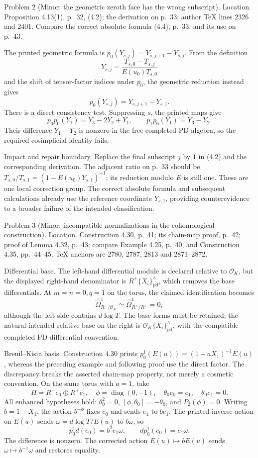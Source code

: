 \documentclass[10pt]{article}
\begin{document}
Problem 2 (Minor: the geometric zeroth face has the wrong subscript).  Location. Proposition 4.13(1), p. 32, (4.2); the derivation on p. 33; author TeX lines 2326 and 2401. Compare the correct absolute formula (4.4), p. 33, and its use on p. 43.\par
The printed geometric formula is \(p_0(Y_{s,j})=Y_{s,j+1}-Y_{s,j}\). From the definition \[Y_{s,j}=\frac{T_{s,0}-T_{s,j}}{E(u_0)T_{s,0}}\] and the shift of tensor-factor indices under \(p_0\), the geometric reduction instead gives \[p_0(Y_{s,j})=Y_{s,j+1}-Y_{s,1}.                 \tag{2.4}\] There is a direct consistency test. Suppressing \(s\), the printed maps give \[p_0p_0(Y_1)=Y_3-2Y_2+Y_1,\qquad
 p_1p_0(Y_1)=Y_3-Y_2.
 \tag{2.5}\] Their difference \(Y_1-Y_2\) is nonzero in the free completed PD algebra, so the required cosimplicial identity fails.\par
Impact and repair boundary. Replace the final subscript \(j\) by \(1\) in (4.2) and the corresponding derivation. The adjacent ratio on p. 33 should be \(T_{s,0}/T_{s,1}=(1-E(u_0)Y_{s,1})^{-1}\); its reduction modulo \(E\) is still one. These are one local correction group. The correct absolute formula and subsequent calculations already use the reference coordinate \(Y_{s,1}\), providing counterevidence to a broader failure of the intended classification.\par
Problem 3 (Minor: incompatible normalizations in the cohomological construction).  Location. Construction 4.30, p. 41; its chain-map proof, p. 42; proof of Lemma 4.32, p. 43; compare Example 4.25, p. 40, and Construction 4.35, pp. 44–45. TeX anchors are 2780, 2787, 2813 and 2871–2872.\par
Differential base. The left-hand differential module is declared relative to \(\mathcal O_K\), but the displayed right-hand denominator is \(R^+\{X_i\}_{\mathrm{pd}}^\wedge\), which removes the base differentials. At \(m=n=0,q=1\) on the torus, the claimed identification becomes \[\widehat\Omega^1_{R^+/\mathcal O_K}\simeq\widehat\Omega^1_{R^+/R^+}=0,
 \tag{2.6}\] although the left side contains \(d\log T\). The base forms must be retained; the natural intended relative base on the right is \(\mathcal O_K\{X_i\}_{\mathrm{pd}}^\wedge\), with the compatible completed PD differential convention.\par
Breuil–Kisin basis. Construction 4.30 prints \(p_0^1(E(u))=(1-aX_1)^{-1}E(u)\), whereas the preceding example and following proof use the direct factor. The discrepancy breaks the asserted chain-map property, not merely a cosmetic convention. On the same torus with \(a=1\), take \[H=R^+e_0\oplus R^+e_1,\quad
 \phi=\operatorname{diag}(0,-1),\quad
 \theta_0e_0=e_1,\quad\theta_0e_1=0.
 \tag{2.7}\] All enhanced hypotheses hold: \(\theta_0^2=0\), \([\phi,\theta_0]=-\theta_0\), and \(P_2(\phi)=0\). Writing \(b=1-X_1\), the action \(b^{-\phi}\) fixes \(e_0\) and sends \(e_1\) to \(be_1\). The printed inverse action on \(E(u)\) sends \(\omega=d\log T/E(u)\) to \(b\omega\), so \[p_0^1d(e_0)=b^2e_1\omega,\qquad
 dp_0^1(e_0)=e_1\omega.                            \tag{2.8}\] The difference is nonzero. The corrected action \(E(u)\mapsto bE(u)\) sends \(\omega\mapsto b^{-1}\omega\) and restores equality.\par
\end{document}
